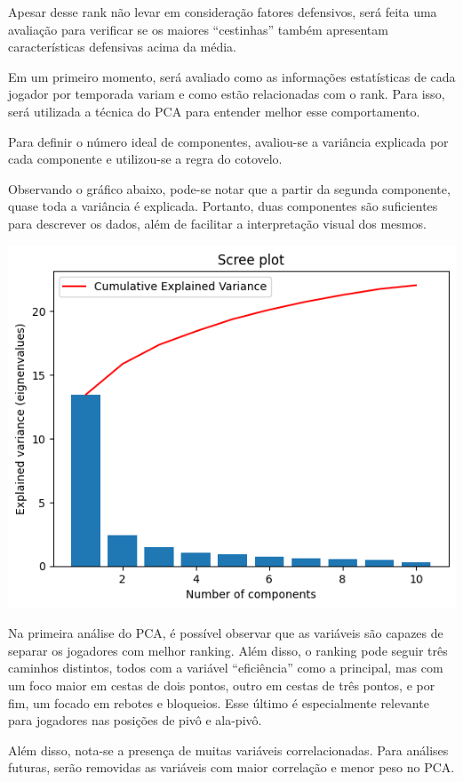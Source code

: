 \documentclass[
]{book}
\begin{document}
Apesar desse rank não levar em consideração fatores defensivos, será feita uma avaliação para verificar se os maiores ``cestinhas'' também apresentam características defensivas acima da média.

Em um primeiro momento, será avaliado como as informações estatísticas de cada jogador por temporada variam e como estão relacionadas com o rank. Para isso, será utilizada a técnica do PCA para entender melhor esse comportamento.

Para definir o número ideal de componentes, avaliou-se a variância explicada por cada componente e utilizou-se a regra do cotovelo.

Observando o gráfico abaixo, pode-se notar que a partir da segunda componente, quase toda a variância é explicada. Portanto, duas componentes são suficientes para descrever os dados, além de facilitar a interpretação visual dos mesmos.

\includegraphics{imagens/3.png}

Na primeira análise do PCA, é possível observar que as variáveis são capazes de separar os jogadores com melhor ranking. Além disso, o ranking pode seguir três caminhos distintos, todos com a variável ``eficiência'' como a principal, mas com um foco maior em cestas de dois pontos, outro em cestas de três pontos, e por fim, um focado em rebotes e bloqueios. Esse último é especialmente relevante para jogadores nas posições de pivô e ala-pivô.

Além disso, nota-se a presença de muitas variáveis correlacionadas. Para análises futuras, serão removidas as variáveis com maior correlação e menor peso no PCA.
\end{document}
